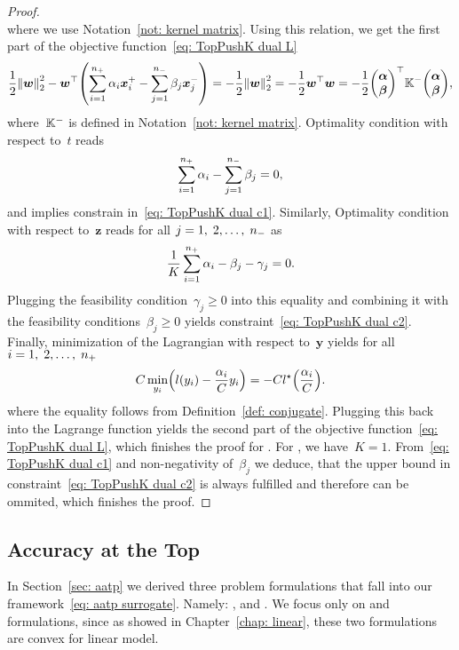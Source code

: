 \begin{proof}
\begin{equation*}
  \end{equation*}
  where we use Notation~\ref{not: kernel matrix}. Using this relation, we get the first part of the objective function~\eqref{eq: TopPushK dual L} 
  \begin{equation*}
    \frac{1}{2} \norm{\bm{w}}_{2}^{2} - \bm{w}^{\top} \Brac{\sum_{i = 1}^{\npos} \alpha_i \bm{x}^+_i - \sum_{j = 1}^{\nneg} \beta_j \bm{x}^-_j}
      = - \frac{1}{2} \norm{\bm{w}}_{2}^{2}
      = - \frac{1}{2} \bm{w}^{\top} \bm{w}
      = - \frac{1}{2} \vecab^{\top} \Kneg \vecab,
  \end{equation*}
  where~$\mathbb{K}^{-}$ is defined in Notation~\ref{not: kernel matrix}. Optimality condition with respect to~$t$ reads 
  \begin{equation*}
    \sum_{i = 1}^{n_{+}} \alpha_i - \sum_{j = 1}^{n_{-}} \beta_j = 0,
  \end{equation*}
  and implies constrain in~\eqref{eq: TopPushK dual c1}. Similarly, Optimality condition with respect to~$\bm{z}$ reads for all $j = 1, \; 2, \ldots, \; n_{-}$ as 
  \begin{equation*}
    \frac{1}{K} \sum_{i = 1}^{n_{+}} \alpha_i - \beta_j - \gamma_j = 0.
  \end{equation*}
  Plugging the feasibility condition~$\gamma_j \geq 0$ into this equality and combining it with the feasibility conditions~$\beta_j \geq 0$ yields constraint~\eqref{eq: TopPushK dual c2}. Finally, minimization of the Lagrangian with respect to~$\bm{y}$ yields for all $i = 1, \; 2, \ldots, \; n_{+}$ 
  \begin{equation*}
    C \min_{y_i} \Brac{l(y_i) - \frac{\alpha_i}{C} y_i} = - C l^{\star} \Brac{\frac{\alpha_i}{C}}.
  \end{equation*}
  where the equality follows from Definition~\ref{def: conjugate}. Plugging this back into the Lagrange function yields the second part of the objective function~\eqref{eq: TopPushK dual L}, which finishes the proof for \TopPushK. For \TopPush, we have~$K = 1.$ From~\eqref{eq: TopPushK dual c1} and non-negativity of~$\beta_j$ we deduce, that the upper bound in constraint~\eqref{eq: TopPushK dual c2} is always fulfilled and therefore can be ommited, which finishes the proof. 
\end{proof}

\subsection{Accuracy at the Top}

In Section~\ref{sec: aatp} we derived three problem formulations that fall into our framework~\eqref{eq: aatp surrogate}. Namely: \Grill, \TopMeanK and \PatMat. We focus only on \TopMeanK and \PatMat formulations, since as showed in Chapter~\ref{chap: linear}, these two formulations are convex for linear model.

